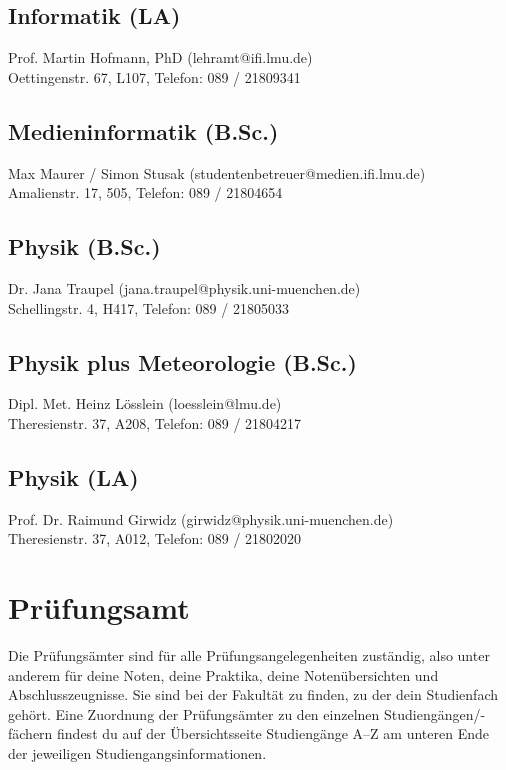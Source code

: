 \subsection*{Informatik (LA)}
Prof. Martin Hofmann, PhD (lehramt@ifi.lmu.de)\\
Oettingenstr. 67, L107, Telefon: 089 / 2180\emd{}9341

\subsection*{Medieninformatik (B.Sc.)}
Max Maurer / Simon Stusak (studentenbetreuer@medien.ifi.lmu.de)\\
Amalienstr. 17, 505, Telefon: 089 / 2180\emd{}4654

\subsection*{Physik (B.Sc.)}
Dr. Jana Traupel (jana.traupel@physik.uni-muenchen.de)\\
Schellingstr. 4, H417, Telefon: 089 / 2180\emd{}5033

\subsection*{Physik plus Meteorologie (B.Sc.)}
Dipl. Met. Heinz Lösslein (loesslein@lmu.de)\\
Theresienstr. 37, A208, Telefon: 089 / 2180\emd{}4217

\subsection*{Physik (LA)}
Prof. Dr. Raimund Girwidz (girwidz@physik.uni-muenchen.de)\\
Theresienstr. 37, A012, Telefon: 089 / 2180\emd{}2020


\section{Prüfungsamt}
Die Prüfungsämter sind für alle Prüfungsangelegenheiten zuständig,
also unter anderem für deine Noten, deine Praktika, deine Notenübersichten und
Abschlusszeugnisse. Sie sind bei der Fakultät zu finden, zu der
dein Studienfach gehört. Eine Zuordnung der Prüfungsämter zu den
einzelnen Studiengängen/-fächern findest du auf der Übersichtsseite
Studiengänge A--Z am unteren Ende der jeweiligen
Studiengangsinformationen.

\begin{urlList}
\end{urlList}

